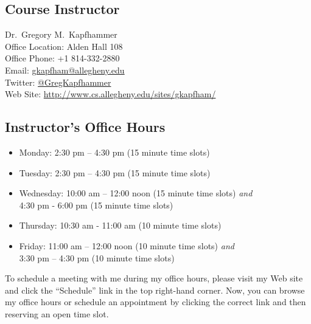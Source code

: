 


\usepackage[compact]{titlesec}



\vspace*{-.1in}
\subsection*{Course Instructor}
Dr.\ Gregory M.\ Kapfhammer\\
\noindent Office Location: Alden Hall 108 \\
\noindent Office Phone: +1 814-332-2880 \\
\noindent Email: \url{gkapfham@allegheny.edu} \\
\noindent Twitter: \url{@GregKapfhammer} \\
\noindent Web Site: \url{http://www.cs.allegheny.edu/sites/gkapfham/} 

\subsection*{Instructor's Office Hours}

\begin{itemize}
  \itemsep 0em
  \item Monday: 2:30 pm -- 4:30 pm (15 minute time slots)
  \item Tuesday: 2:30 pm -- 4:30 pm (15 minute time slots)
  \item Wednesday: 10:00 am -- 12:00 noon (15 minute time slots) {\em and} \\ \hspace*{.8in}
    4:30 pm - 6:00 pm (15 minute time slots)
  \item Thursday: 10:30 am - 11:00 am (10 minute time slots)
  \item Friday: 11:00 am -- 12:00 noon (10 minute time slots) {\em and} \\ \hspace*{.49in} 3:30 pm -- 4:30 pm (10 minute time slots)
\end{itemize}

\vspace*{-.1in}
\noindent
To schedule a meeting with me during my office hours, please visit my Web site and click the ``Schedule'' link in the
top right-hand corner. Now, you can browse my office hours or schedule an appointment by clicking the correct link and
then reserving an open time slot. 

